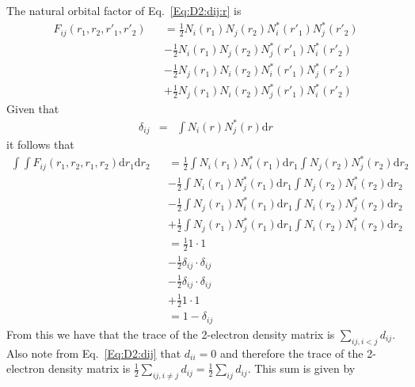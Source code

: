 \documentclass[pra,nofootinbib]{revtex4-1}
\begin{document}
The natural orbital factor of Eq.~\ref{Eq:D2:dij:r} is
\begin{eqnarray}
  F_{ij}(r_1,r_2,r'_1,r'_2)
  &&= \frac{1}{2} N_i(r_1)N_j(r_2) N_i^*(r'_1)N_j^*(r'_2) \nonumber \\
  &&- \frac{1}{2} N_i(r_1)N_j(r_2) N_j^*(r'_1)N_i^*(r'_2) \nonumber \\
  &&- \frac{1}{2} N_j(r_1)N_i(r_2) N_i^*(r'_1)N_j^*(r'_2) \nonumber \\
  &&+ \frac{1}{2} N_j(r_1)N_i(r_2) N_j^*(r'_1)N_i^*(r'_2)
\end{eqnarray}
Given that 
\begin{eqnarray}
  \delta_{ij} &=& \int N_i(r) N_j^*(r)\mathrm{d}r
\end{eqnarray}
it follows that 
\begin{eqnarray}
  \int\int F_{ij}(r_1,r_2,r_1,r_2)\mathrm{d}r_1\mathrm{d}r_2
  &&= \frac{1}{2} \int N_i(r_1)N_i^*(r_1)\mathrm{d}r_1 \int N_j(r_2)N_j^*(r_2)\mathrm{d}r_2 \nonumber \\
  &&- \frac{1}{2} \int N_i(r_1)N_j^*(r_1)\mathrm{d}r_1 \int N_j(r_2)N_i^*(r_2)\mathrm{d}r_2 \nonumber \\
  &&- \frac{1}{2} \int N_j(r_1)N_i^*(r_1)\mathrm{d}r_1 \int N_i(r_2)N_j^*(r_2)\mathrm{d}r_2 \nonumber \\
  &&+ \frac{1}{2} \int N_j(r_1)N_j^*(r_1)\mathrm{d}r_1 \int N_i(r_2)N_i^*(r_2)\mathrm{d}r_2 \\
  &&= \frac{1}{2} 1 \cdot 1 \nonumber \\
  &&- \frac{1}{2} \delta_{ij} \cdot \delta_{ij} \nonumber \\
  &&- \frac{1}{2} \delta_{ij} \cdot \delta_{ij} \nonumber \\
  &&+ \frac{1}{2} 1 \cdot 1  \\
  &&= 1-\delta_{ij}
\end{eqnarray}
From this we have that the trace of the 2-electron density matrix is
$\sum_{ij,i < j}d_{ij}$. Also note from Eq.~\ref{Eq:D2:dij} that $d_{ii} = 0$
and therefore the trace of the 2-electron density matrix is
$\frac{1}{2}\sum_{ij,i \ne j}d_{ij} = \frac{1}{2}\sum_{ij}d_{ij}$. This sum is given by
\end{document}
